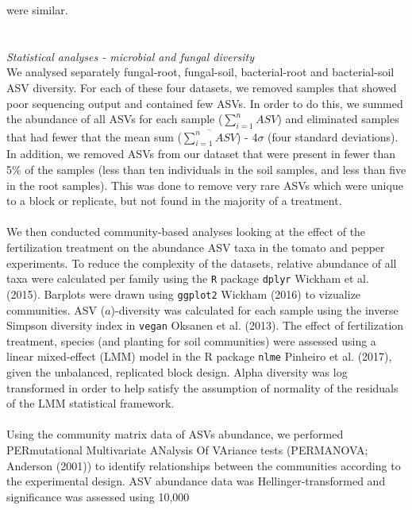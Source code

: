 \documentclass[11pt,]{article}
\begin{document}
were similar.\\
\hspace*{0.333em}\\
\hspace*{0.333em}\\
\emph{Statistical analyses - microbial and fungal diversity}\\
We analysed separately fungal-root, fungal-soil, bacterial-root and
bacterial-soil ASV diversity. For each of these four datasets, we
removed samples that showed poor sequencing output and contained few
ASVs. In order to do this, we summed the abundance of all ASVs for each
sample (\(\sum_{i=1}^n ASV\)) and eliminated samples that had fewer that
the mean sum (\(\overline{\sum_{i=1}^n ASV}\)) - 4\(\sigma\) (four
standard deviations). In addition, we removed ASVs from our dataset that
were present in fewer than 5\% of the samples (less than ten individuals
in the soil samples, and less than five in the root samples). This was
done to remove very rare ASVs which were unique to a block or replicate,
but not found in the majority of a treatment.\\
\hspace*{0.333em}\\
We then conducted community-based analyses looking at the effect of the
fertilization treatment on the abundance ASV taxa in the tomato and
pepper experiments. To reduce the complexity of the datasets, relative
abundance of all taxa were calculated per family using the \texttt{R}
package \texttt{dplyr} Wickham et al. (2015). Barplots were drawn using
\texttt{ggplot2} Wickham (2016) to vizualize communities. ASV
(\(a\))-diversity was calculated for each sample using the inverse
Simpson diversity index in \texttt{vegan} Oksanen et al. (2013). The
effect of fertilization treatment, species (and planting for soil
communities) were assessed using a linear mixed-effect (LMM) model in
the R package \texttt{nlme} Pinheiro et al. (2017), given the
unbalanced, replicated block design. Alpha diversity was log transformed
in order to help satisfy the assumption of normality of the residuals of
the LMM statistical framework.\\
\hspace*{0.333em}\\
Using the community matrix data of ASVs abundance, we performed
PERmutational Multivariate ANalysis Of VAriance tests (PERMANOVA;
Anderson (2001)) to identify relationships between the communities
according to the experimental design. ASV abundance data was
Hellinger-transformed and significance was assessed using 10,000
\end{document}
